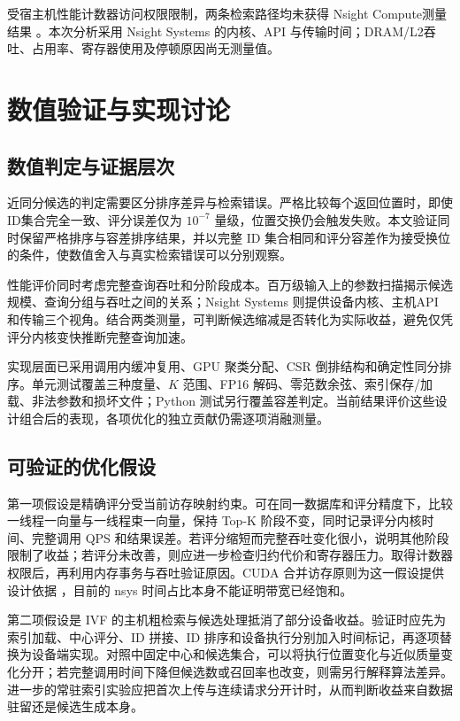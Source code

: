 \documentclass[UTF8,a4paper,zihao=5,fontset=none]{ctexart}
\begin{document}
受宿主机性能计数器访问权限限制，两条检索路径均未获得 Nsight Compute测量结果 \cite{r12}。本次分析采用 Nsight Systems 的内核、API 与传输时间；DRAM/L2吞吐、占用率、寄存器使用及停顿原因尚无测量值。


\section{数值验证与实现讨论}

\subsection{数值判定与证据层次}

近同分候选的判定需要区分排序差异与检索错误。严格比较每个返回位置时，即使 ID集合完全一致、评分误差仅为 $10^{-7}$ 量级，位置交换仍会触发失败。本文验证同时保留严格排序与容差排序结果，并以完整 ID 集合相同和评分容差作为接受换位的条件，使数值舍入与真实检索错误可以分别观察。


性能评价同时考虑完整查询吞吐和分阶段成本。百万级输入上的参数扫描揭示候选规模、查询分组与吞吐之间的关系；Nsight Systems 则提供设备内核、主机API 和传输三个视角。结合两类测量，可判断候选缩减是否转化为实际收益，避免仅凭评分内核变快推断完整查询加速。


实现层面已采用调用内缓冲复用、GPU 聚类分配、CSR 倒排结构和确定性同分排序。单元测试覆盖三种度量、$K$ 范围、FP16 解码、零范数余弦、索引保存/加载、非法参数和损坏文件；Python 测试另行覆盖容差判定。当前结果评价这些设计组合后的表现，各项优化的独立贡献仍需逐项消融测量。


\subsection{可验证的优化假设}

第一项假设是精确评分受当前访存映射约束。可在同一数据库和评分精度下，比较一线程一向量与一线程束一向量，保持 Top-K 阶段不变，同时记录评分内核时间、完整调用 QPS 和结果误差。若评分缩短而完整吞吐变化很小，说明其他阶段限制了收益；若评分未改善，则应进一步检查归约代价和寄存器压力。取得计数器权限后，再利用内存事务与吞吐验证原因。CUDA 合并访存原则为这一假设提供设计依据 \cite{r9}，目前的 nsys 时间占比本身不能证明带宽已经饱和。


第二项假设是 IVF 的主机粗检索与候选处理抵消了部分设备收益。验证时应先为索引加载、中心评分、ID 拼接、ID 排序和设备执行分别加入时间标记，再逐项替换为设备端实现。对照中固定中心和候选集合，可以将执行位置变化与近似质量变化分开；若完整调用时间下降但候选数或召回率也改变，则需另行解释算法差异。进一步的常驻索引实验应把首次上传与连续请求分开计时，从而判断收益来自数据驻留还是候选生成本身。
\end{document}
